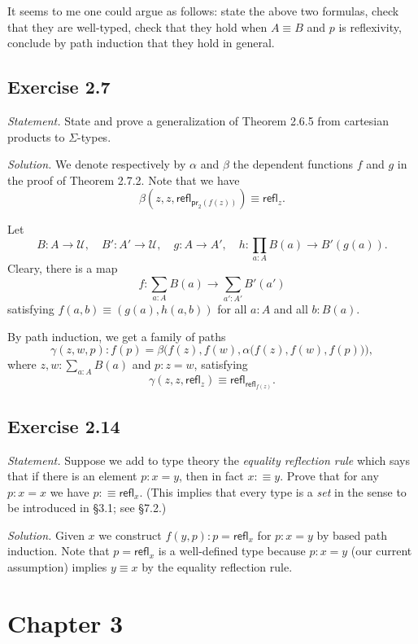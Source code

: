 \documentclass[12pt]{article}
\newcommand{\ee}{\equiv}
\newcommand{\nn}{\noindent}
\newcommand{\pr}{\mathsf{pr}}
\newcommand{\refl}{\mathsf{refl}}
\newcommand{\U}{\mathcal U}
\begin{document}
It seems to me one could argue as follows: state the above two formulas, check that they are well-typed, check that they hold when $A\ee B$ and $p$ is reflexivity, conclude by path induction that they hold in general.


\subsection{Exercise 2.7}

\emph{Statement.} State and prove a generalization of Theorem 2.6.5 from cartesian products to $\Sigma$-types. 

\nn\emph{Solution.} We denote respectively by $\alpha$ and $\beta$ the dependent functions $f$ and $g$ in the proof of Theorem 2.7.2. Note that we have 
$$
\beta(z,z,\refl_{\pr_2(f(z))})\equiv\refl_z.
$$

Let 
$$
B:A\to\U,\quad B':A'\to\U,\quad g:A\to A',\quad h:\prod_{a:A}B(a)\to B'(g(a)).
$$ 
Cleary, there is a map 
$$
f:\sum_{a:A}B(a)\to\sum_{a':A'}B'(a')
$$ 
satisfying $f(a,b)\equiv (g(a),h(a,b))$ for all $a:A$ and all $b:B(a)$. 

By path induction, we get a family of paths 
$$
\gamma(z,w,p):f(p)=\beta\Big(f(z),f(w),\alpha\big(f(z),f(w),f(p)\big)\Big),
$$ 
where $z,w:\sum_{a:A}B(a)$ and $p:z=w$, satisfying 
$$
\gamma(z,z,\refl_z)\equiv\refl_{\refl_{f(z)}}.
$$


\subsection{Exercise 2.14}

\emph{Statement.} Suppose we add to type theory the \emph{equality reflection rule} which says that if there is an element $p:x=y$, then in fact $x:\equiv y$. Prove that for any $p:x=x$ we have $p:\equiv\refl_x$. (This implies that every type is a \emph{set} in the sense to be introduced in \S3.1; see \S7.2.)

\nn\emph{Solution.} Given $x$ we construct $f(y,p):p=\refl_x$ for $p:x=y$ by based path induction. Note that $p=\refl_x$ is a well-defined type because $p:x=y$ (our current assumption) implies $y\equiv x$ by the equality reflection rule.


\section{Chapter 3}
\end{document}
